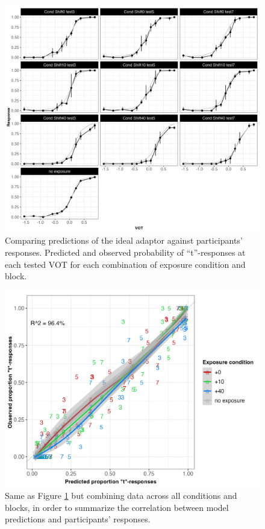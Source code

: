 \documentclass[
  11pt,
  man,mask,floatsintext]{apa6}
\begin{document}
\begin{figure}[H]

{\centering \includegraphics[width=1\linewidth]{../figures/ideal-adaptor-fitconditions-blocks} 

}

\caption{Comparing predictions of the ideal adaptor against participants' responses. Predicted and observed probability of ``t''-responses at each tested VOT for each combination of exposure condition and block.}\label{fig:ideal-adaptor-test-categorization}
\end{figure}



\begin{figure}[H]

{\centering \includegraphics[width=1\linewidth]{../figures/ideal-adaptor-fit} 

}

\caption{Same as Figure \ref{fig:ideal-adaptor-test-categorization} but combining data across all conditions and blocks, in order to summarize the correlation between model predictions and participants' responses.}\label{fig:ideal-adaptor-test-categorization-r2}
\end{figure}
\end{document}

